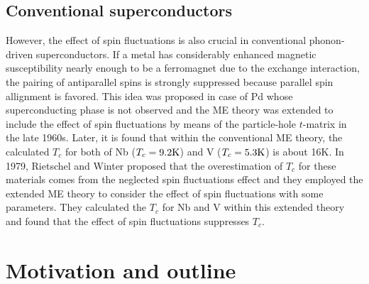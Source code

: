 \subsection{Conventional superconductors}
However, the effect of spin fluctuations is also crucial in conventional phonon-driven superconductors.
If a metal has considerably enhanced magnetic susceptibility nearly enough to be a ferromagnet
due to the exchange interaction, the pairing of antiparallel spins is strongly suppressed because
parallel spin allignment is favored. This idea was proposed in case of Pd whose superconducting phase
is not observed\cite{Parks1969} and the ME theory was extended to include the effect of spin 
fluctuations by means of the particle-hole $t$-matrix in the late 1960s\cite{Berk1966, Schrieffer1968}.
Later, it is found that within the conventional ME theory, the calculated $T_c$ for both of Nb 
($T_c = 9.2 \rm K$) and V ($T_c = 5.3 \rm K$) is about 16K\cite{Papa1977}.
In 1979, Rietschel and Winter\cite{Rietschel1979} proposed that the overestimation of $T_c$ for 
these materials comes from the neglected spin fluctuations effect and they employed the extended ME 
theory to consider the effect of spin fluctuations with some parameters. They calculated the $T_c$ 
for Nb and V within this extended theory and found that the effect of spin fluctuations suppresses $T_c$. 

\section{Motivation and outline}

